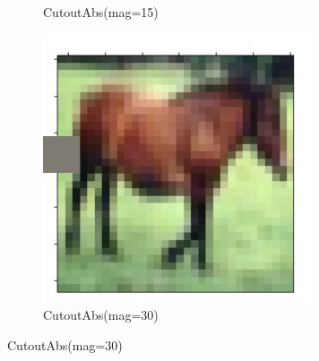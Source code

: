 \documentclass[onecolumn]{ujarticle}   %
\begin{document}
\begin{figure}[h]
\begin{subfigure}{0.3\columnwidth}
        \caption{CutoutAbs(mag=15)}
        \label{fig:CutoutAbs_15}
      \end{subfigure}
      \begin{subfigure}{0.3\columnwidth}
        \centering
        \includegraphics[width=1.0\columnwidth]{transform_test/CutoutAbs_30.png}
        \caption{CutoutAbs(mag=30)}
        \label{fig:CutoutAbs_30}
      \end{subfigure}


\end{figure}
\end{document}
